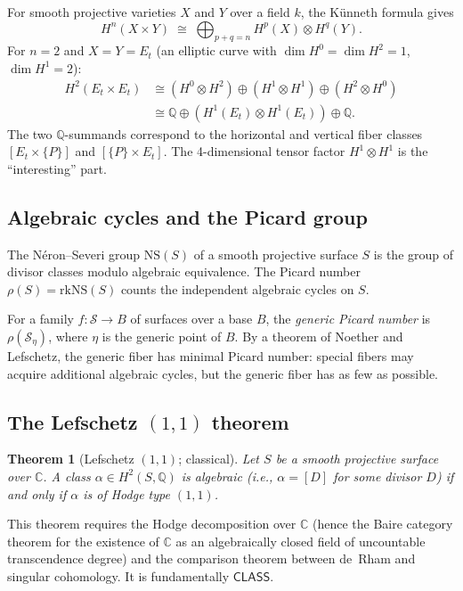 \documentclass[11pt]{article}
\theoremstyle{plain}
\newtheorem{theorem}{Theorem}[section]
\theoremstyle{definition}
\theoremstyle{remark}
\newcommand{\Q}{\mathbb{Q}}
\newcommand{\C}{\mathbb{C}}
\newcommand{\rk}{\mathrm{rk}}
\newcommand{\NS}{\mathrm{NS}}
\newcommand{\CLASS}{\mathsf{CLASS}}
\begin{document}
For smooth projective varieties $X$ and $Y$ over a field $k$, the K\"unneth formula gives
\[
  H^n(X \times Y) \;\cong\; \bigoplus_{p+q=n} H^p(X) \otimes H^q(Y).
\]
For $n = 2$ and $X = Y = E_t$ (an elliptic curve with $\dim H^0 = \dim H^2 = 1$, $\dim H^1 = 2$):
\begin{align*}
  H^2(E_t \times E_t) &\cong (H^0 \otimes H^2) \oplus (H^1 \otimes H^1) \oplus (H^2 \otimes H^0) \\
    &\cong \Q \oplus (H^1(E_t) \otimes H^1(E_t)) \oplus \Q.
\end{align*}
The two $\Q$-summands correspond to the horizontal and vertical fiber classes $[E_t \times \{P\}]$ and $[\{P\} \times E_t]$.
The 4-dimensional tensor factor $H^1 \otimes H^1$ is the ``interesting'' part.

\subsection{Algebraic cycles and the Picard group}

The N\'eron--Severi group $\NS(S)$ of a smooth projective surface $S$ is the group of divisor classes modulo algebraic equivalence.
The Picard number $\rho(S) = \rk \NS(S)$ counts the independent algebraic cycles on $S$.

For a family $f : \mathcal{S} \to B$ of surfaces over a base $B$, the \emph{generic Picard number} is $\rho(\mathcal{S}_\eta)$, where $\eta$ is the generic point of $B$.
By a theorem of Noether and Lefschetz, the generic fiber has minimal Picard number: special fibers may acquire additional algebraic cycles, but the generic fiber has as few as possible.

\subsection{The Lefschetz $(1,1)$ theorem}

\begin{theorem}[Lefschetz $(1,1)$; classical]
Let $S$ be a smooth projective surface over $\C$.
A class $\alpha \in H^2(S, \Q)$ is algebraic (i.e., $\alpha = [D]$ for some divisor $D$) if and only if $\alpha$ is of Hodge type $(1,1)$.
\end{theorem}

This theorem requires the Hodge decomposition over $\C$ (hence the Baire category theorem for the existence of $\C$ as an algebraically closed field of uncountable transcendence degree) and the comparison theorem between de~Rham and singular cohomology.
It is fundamentally $\CLASS$.
\end{document}
